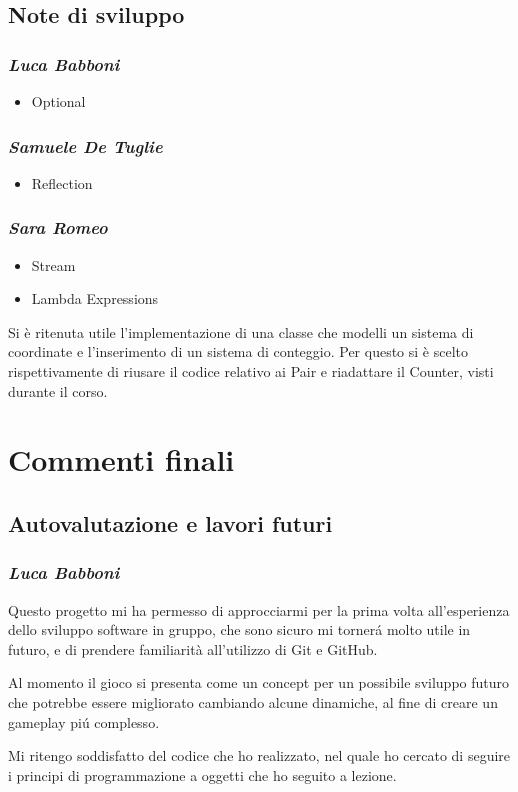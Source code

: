 \documentclass[a4paper,titlepage,12pt]{article}
\begin{document}
\subsection{Note di sviluppo}
\subsubsection*{\large \slshape Luca Babboni}
\begin{itemize}
    \item[\ding{223}] Optional
\end{itemize}

\subsubsection*{\large \slshape Samuele De Tuglie}
\begin{itemize}
    \item[\ding{223}] Reflection
\end{itemize}

\subsubsection*{\large \slshape Sara Romeo}
\begin{itemize}
    \item[\ding{223}] Stream
    \item[\ding{223}] Lambda Expressions
\end{itemize}
Si è ritenuta utile l'implementazione di una classe che modelli un sistema di coordinate e l'inserimento di un sistema di conteggio. Per questo si è scelto rispettivamente di riusare il codice relativo ai Pair e riadattare il Counter, visti durante il corso.

\newpage
\section{Commenti finali}
\subsection{Autovalutazione e lavori futuri}
\subsubsection*{\large \slshape Luca Babboni}
\par \noindent Questo progetto mi ha permesso di approcciarmi per la prima volta all’esperienza dello sviluppo software in gruppo, che sono sicuro mi tornerá molto utile in futuro, e di prendere familiarità all'utilizzo di Git e GitHub. 
\par \noindent Al momento il gioco si presenta come un concept per un possibile sviluppo futuro che potrebbe essere migliorato cambiando alcune dinamiche, al fine di creare un gameplay piú complesso. 
\par \noindent Mi ritengo soddisfatto del codice che ho realizzato, nel quale ho cercato di seguire i principi di programmazione a oggetti che ho seguito  a lezione. 
\end{document}
